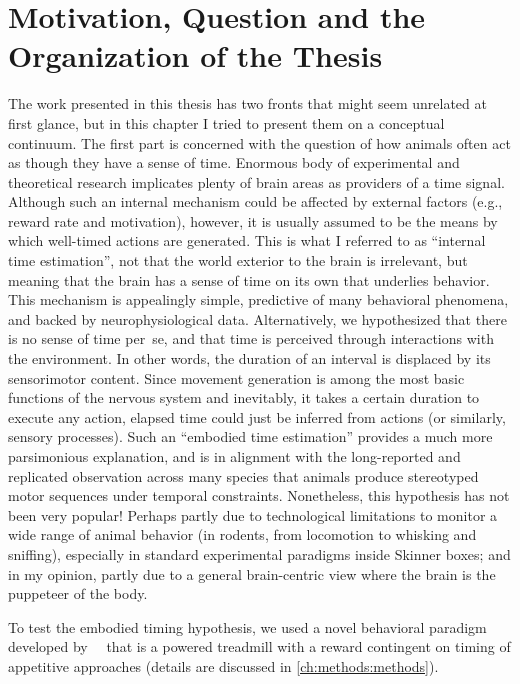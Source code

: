 \section[Motivation, Question and More]{Motivation, Question and the Organization of the Thesis}
\label{intro:question}

The work presented in this thesis has two fronts that might seem unrelated at first glance, but in this chapter I tried to present them on a conceptual continuum.
The first part is concerned with the question of how animals often act as though they have a sense of time.
Enormous body of experimental and theoretical research implicates plenty of brain areas as providers of a time signal.
Although such an internal mechanism could be affected by external factors (e.g., reward rate and motivation), however, it is usually assumed to be the means by which well-timed actions are generated.
This is what I referred to as ``internal time estimation'', not that the world exterior to the brain is irrelevant, but meaning that the brain has a sense of time on its own that underlies behavior.
This mechanism is appealingly simple, predictive of many behavioral phenomena, and backed by neurophysiological data.
Alternatively, we hypothesized that there is no sense of time per~se, and that time is perceived through interactions with the environment.
In other words, the duration of an interval is displaced by its sensorimotor content.
Since movement generation is among the most basic functions of the nervous system and inevitably, it takes a certain duration to execute any action, elapsed time could just be inferred from actions (or similarly, sensory processes).
Such an ``embodied time estimation'' provides a much more parsimonious explanation, and is in alignment with the long-reported and replicated observation across many species that animals produce stereotyped motor sequences under temporal constraints.
Nonetheless, this hypothesis has not been very popular!
Perhaps partly due to technological limitations to monitor a wide range of animal behavior (in rodents, from locomotion to whisking and sniffing), especially in standard experimental paradigms inside Skinner boxes; and in my opinion, partly due to a general brain-centric view where the brain is the puppeteer of the body.
\par
To test the embodied timing hypothesis, we used a novel behavioral paradigm developed by~\citeauthor{Rueda2015NN}~\cite{Rueda2015NN} that is a powered treadmill with a reward contingent on timing of appetitive approaches (details are discussed in \autoref{ch:methods:methods}).
